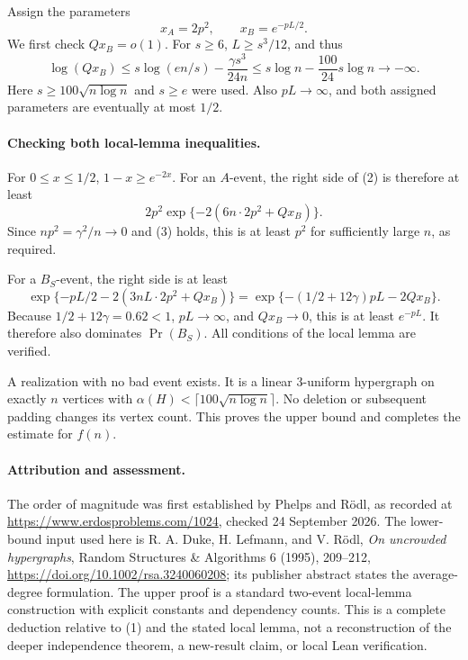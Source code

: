 Assign the parameters
\[
 x_A=2p^2,\qquad x_B=e^{-pL/2}.
\]
We first check \(Qx_B=o(1)\). For \(s\geq6\), \(L\geq s^3/12\), and thus
\[
 \log(Qx_B)
 \leq s\log(en/s)-\frac{\gamma s^3}{24n}
 \leq s\log n-\frac{100}{24}s\log n
 \longrightarrow-\infty. \tag{3}
\]
Here \(s\geq100\sqrt{n\log n}\) and \(s\geq e\) were used. Also \(pL\to\infty\), and both assigned parameters are eventually at most \(1/2\).

\paragraph{Checking both local-lemma inequalities.}
For \(0\leq x\leq1/2\), \(1-x\geq e^{-2x}\). For an \(A\)-event, the right side of (2) is therefore at least
\[
 2p^2\exp\{-2(6n\cdot2p^2+Qx_B)\}.
\]
Since \(np^2=\gamma^2/n\to0\) and (3) holds, this is at least \(p^2\) for sufficiently large \(n\), as required.

For a \(B_S\)-event, the right side is at least
\[
 \exp\{-pL/2-2(3nL\cdot2p^2+Qx_B)\}
 =\exp\{-(1/2+12\gamma)pL-2Qx_B\}.
\]
Because \(1/2+12\gamma=0.62<1\), \(pL\to\infty\), and \(Qx_B\to0\), this is at least \(e^{-pL}\). It therefore also dominates \(\Pr(B_S)\). All conditions of the local lemma are verified.

A realization with no bad event exists. It is a linear 3-uniform hypergraph on exactly \(n\) vertices with
\(\alpha(H)<\lceil100\sqrt{n\log n}\rceil\). No deletion or subsequent padding changes its vertex count. This proves the upper bound and completes the estimate for \(f(n)\).

\paragraph{Attribution and assessment.}
The order of magnitude was first established by Phelps and R\"odl, as recorded at \url{https://www.erdosproblems.com/1024}, checked 24 September 2026. The lower-bound input used here is R. A. Duke, H. Lefmann, and V. R\"odl, \emph{On uncrowded hypergraphs}, Random Structures \& Algorithms 6 (1995), 209--212, \url{https://doi.org/10.1002/rsa.3240060208}; its publisher abstract states the average-degree formulation. The upper proof is a standard two-event local-lemma construction with explicit constants and dependency counts. This is a complete deduction relative to (1) and the stated local lemma, not a reconstruction of the deeper independence theorem, a new-result claim, or local Lean verification.
